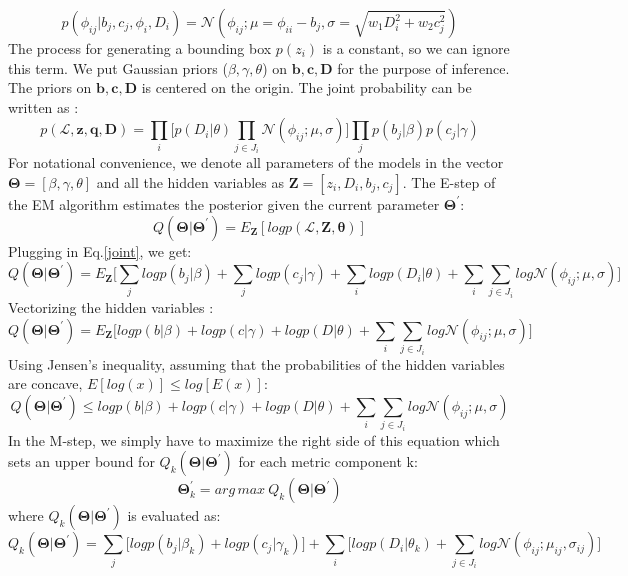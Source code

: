 \documentclass[12pt]{article}
\begin{document}
\begin{equation}
p(\phi_{ij}|b_j,c_j,\phi_i,D_i)=\mathcal{N}(\phi_{ij};\mu=\phi_{ii}-b_j, \sigma=\sqrt{w_1 D_i^2+w_2 c_j^2})
\end{equation}
The process for generating a bounding box $p(z_i)$ is a constant, so we can ignore this term. We put Gaussian priors ($\beta,\gamma,\theta$) on $\textbf{b},\textbf{c},\textbf{D}$ for the purpose of inference. The priors on $\textbf{b},\textbf{c},\textbf{D}$ is centered on the origin. The joint probability can be written as : 
\begin{equation}
p(\mathcal{L},\textbf{z},\textbf{q},\textbf{D}) = \prod_i \Big[p(D_i|\theta)\prod_{j\in J_i} \mathcal{N}(\phi_{ij};\mu, \sigma)\Big]\prod_j p(b_j|\beta) p(c_j|\gamma) 
\label{joint}
\end{equation} 
For notational convenience, we denote all parameters of the models in the vector  $\mathbf{\Theta}=[\beta ,\gamma ,\theta]$ and all the hidden variables as $\mathbf{Z}=[z_i,D_i,b_j,c_j]$. The E-step of the EM algorithm estimates the posterior given the current parameter $\mathbf{\Theta}^\prime$:
\begin{equation}
Q(\mathbf{\Theta}|\mathbf{\Theta}^\prime)=E_\mathbf{Z}[log p(\mathcal{L},\mathbf{Z},\mathbf{\theta})]
\end{equation}
Plugging in Eq.\ref{joint}, we get: 
\begin{equation}
Q(\mathbf{\Theta}|\mathbf{\Theta}^\prime)=E_\mathbf{Z}\Big[\sum_j log p(b_j|\beta)+\sum_j  log p(c_j|\gamma)+\sum_i  log p(D_i|\theta)+\sum_i\sum_{j\in J_i}log \mathcal{N}(\phi_{ij};\mu,\sigma)\Big]
\end{equation}
Vectorizing the hidden variables : 
\begin{equation}
Q(\mathbf{\Theta}|\mathbf{\Theta}^\prime)=E_\mathbf{Z}\Big[ log p(b|\beta)+  log p(c|\gamma)+  log p(D|\theta)+\sum_i\sum_{j\in J_i}log \mathcal{N}(\phi_{ij};\mu,\sigma)\Big]
\end{equation}
Using Jensen's inequality, assuming that the probabilities of the hidden variables are concave,  $E[log(x)]\leq log[E(x)]$:
\begin{equation}
Q(\mathbf{\Theta}|\mathbf{\Theta}^\prime)\leq log p(b|\beta)+  log p(c|\gamma)+  log p(D|\theta)+\sum_i\sum_{j\in J_i}log \mathcal{N}(\phi_{ij};\mu,\sigma)
\end{equation}
In the M-step, we simply have to maximize the right side of this equation which sets an upper bound for $Q_k(\mathbf{\Theta}|\mathbf{\Theta}^\prime)$ for each metric component k:
\begin{equation}
\mathbf{\Theta}_k^\prime = arg\,max\ Q_k(\mathbf{\Theta}|\mathbf{\Theta}^\prime)
\end{equation}
where $Q_k(\mathbf{\Theta}|\mathbf{\Theta}^\prime)$ is evaluated as: 
\begin{equation}
Q_k(\mathbf{\Theta}|\mathbf{\Theta}^\prime)= \sum_j \Bigg[ log p(b_j|\beta_k)+  log p(c_j|\gamma_k)\Bigg] + \sum_i \Bigg[log p(D_i|\theta_k) + \sum_{j\in J_i}   log \mathcal{N}(\phi_{ij};\mu_{ij},\sigma_{ij}) \Bigg]
\end{equation}
\end{document}
